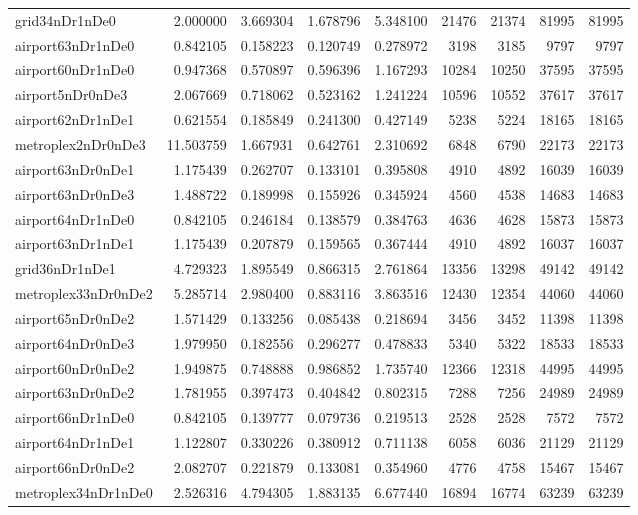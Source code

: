 \begin{longtable}{|l|r|r|r|r|r|r|r|r|}
grid34nDr1nDe0 & 2.000000 & 3.669304 & 1.678796 & 5.348100 & 21476 & 21374 & 81995 & 81995 \\
airport63nDr1nDe0 & 0.842105 & 0.158223 & 0.120749 & 0.278972 & 3198 & 3185 & 9797 & 9797 \\
airport60nDr1nDe0 & 0.947368 & 0.570897 & 0.596396 & 1.167293 & 10284 & 10250 & 37595 & 37595 \\
airport5nDr0nDe3 & 2.067669 & 0.718062 & 0.523162 & 1.241224 & 10596 & 10552 & 37617 & 37617 \\
airport62nDr1nDe1 & 0.621554 & 0.185849 & 0.241300 & 0.427149 & 5238 & 5224 & 18165 & 18165 \\
metroplex2nDr0nDe3 & 11.503759 & 1.667931 & 0.642761 & 2.310692 & 6848 & 6790 & 22173 & 22173 \\
airport63nDr0nDe1 & 1.175439 & 0.262707 & 0.133101 & 0.395808 & 4910 & 4892 & 16039 & 16039 \\
airport63nDr0nDe3 & 1.488722 & 0.189998 & 0.155926 & 0.345924 & 4560 & 4538 & 14683 & 14683 \\
airport64nDr1nDe0 & 0.842105 & 0.246184 & 0.138579 & 0.384763 & 4636 & 4628 & 15873 & 15873 \\
airport63nDr1nDe1 & 1.175439 & 0.207879 & 0.159565 & 0.367444 & 4910 & 4892 & 16037 & 16037 \\
grid36nDr1nDe1 & 4.729323 & 1.895549 & 0.866315 & 2.761864 & 13356 & 13298 & 49142 & 49142 \\
metroplex33nDr0nDe2 & 5.285714 & 2.980400 & 0.883116 & 3.863516 & 12430 & 12354 & 44060 & 44060 \\
airport65nDr0nDe2 & 1.571429 & 0.133256 & 0.085438 & 0.218694 & 3456 & 3452 & 11398 & 11398 \\
airport64nDr0nDe3 & 1.979950 & 0.182556 & 0.296277 & 0.478833 & 5340 & 5322 & 18533 & 18533 \\
airport60nDr0nDe2 & 1.949875 & 0.748888 & 0.986852 & 1.735740 & 12366 & 12318 & 44995 & 44995 \\
airport63nDr0nDe2 & 1.781955 & 0.397473 & 0.404842 & 0.802315 & 7288 & 7256 & 24989 & 24989 \\
airport66nDr1nDe0 & 0.842105 & 0.139777 & 0.079736 & 0.219513 & 2528 & 2528 & 7572 & 7572 \\
airport64nDr1nDe1 & 1.122807 & 0.330226 & 0.380912 & 0.711138 & 6058 & 6036 & 21129 & 21129 \\
airport66nDr0nDe2 & 2.082707 & 0.221879 & 0.133081 & 0.354960 & 4776 & 4758 & 15467 & 15467 \\
metroplex34nDr1nDe0 & 2.526316 & 4.794305 & 1.883135 & 6.677440 & 16894 & 16774 & 63239 & 63239 \\

\end{longtable}
